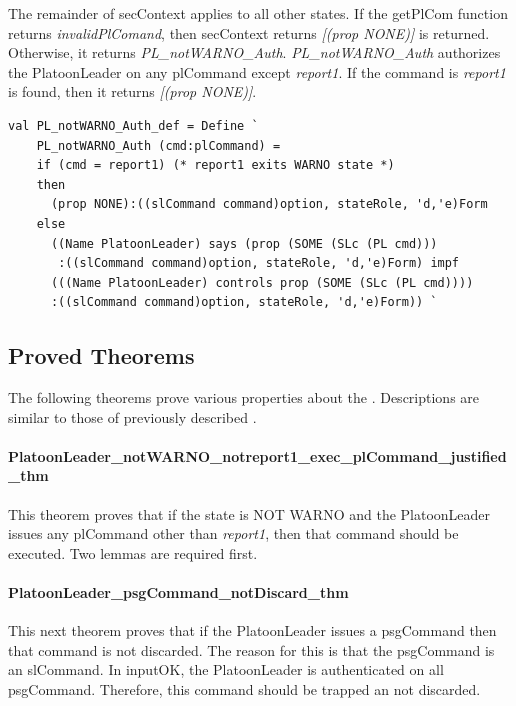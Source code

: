 \documentclass[../../main/main.tex]{subfiles}
\begin{document}
The remainder of secContext applies to all other states.  If the getPlCom function returns \textit{invalidPlComand}, then secContext returns  \textit{ [(prop NONE)]} is returned.  Otherwise, it returns \textit{PL_notWARNO_Auth}.  \textit{PL_notWARNO_Auth} authorizes the PlatoonLeader on any plCommand except \textit{report1}. If the command is \textit{report1} is found, then it returns \textit{ [(prop NONE)]}.

\begin{lstlisting}
val PL_notWARNO_Auth_def = Define `
    PL_notWARNO_Auth (cmd:plCommand) =
    if (cmd = report1) (* report1 exits WARNO state *)
    then
      (prop NONE):((slCommand command)option, stateRole, 'd,'e)Form
    else
      ((Name PlatoonLeader) says (prop (SOME (SLc (PL cmd)))
       :((slCommand command)option, stateRole, 'd,'e)Form) impf
      (((Name PlatoonLeader) controls prop (SOME (SLc (PL cmd))))
      :((slCommand command)option, stateRole, 'd,'e)Form)) `
\end{lstlisting}

\subsection{Proved Theorems}
The following theorems prove various properties about the .  Descriptions are similar to those of previously described .  


\paragraph*{PlatoonLeader_notWARNO_notreport1_exec_plCommand_justified_thm}
This theorem proves that if the state is NOT WARNO and the PlatoonLeader issues any plCommand other than \textit{report1}, then that command should be executed.  Two lemmas are required first.

\HOLssmPlanPBTheoremsPlatoonLeaderXXnotWARNOXXnotreportOneXXexecXXplCommandXXlemma

\HOLssmPlanPBTheoremsPlatoonLeaderXXnotWARNOXXnotreportOneXXexecXXplCommandXXjustifiedXXlemma

\HOLssmPlanPBTheoremsPlatoonLeaderXXnotWARNOXXnotreportOneXXexecXXplCommandXXjustifiedXXthm

\paragraph*{PlatoonLeader_psgCommand_notDiscard_thm}
This next theorem proves that if the PlatoonLeader issues a psgCommand then that command is not discarded.  The reason for this is that the psgCommand is an slCommand.  In inputOK, the PlatoonLeader is authenticated on all psgCommand.  Therefore, this command should be trapped an not discarded.
\end{document}
